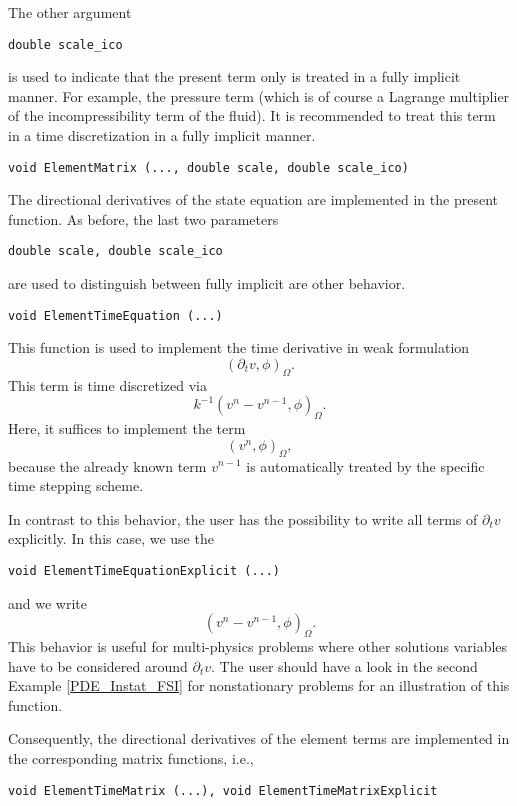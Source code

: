 The other argument
\begin{verbatim}
double scale_ico
\end{verbatim} 
is used to indicate that the present term 
only is treated in a fully implicit manner. 
For example, the pressure term (which is of course
a Lagrange multiplier of the incompressibility 
term of the fluid). It is recommended to treat 
this term in a time discretization in a fully 
implicit manner. 

\begin{verbatim}
void ElementMatrix (..., double scale, double scale_ico)
\end{verbatim}
The directional derivatives of the state equation
are implemented in the present function. As before,
the last two parameters
\begin{verbatim}
double scale, double scale_ico
\end{verbatim} 
are used to distinguish between fully implicit 
are other behavior. 

\begin{verbatim}
void ElementTimeEquation (...) 
\end{verbatim}
This function is used to implement the 
time derivative in weak formulation 
\begin{equation*}
(\partial_t v, \phi)_{\Omega}.
\end{equation*}
This term is time discretized via
\begin{equation*}
k^{-1} (v^n - v^{n-1} , \phi)_{\Omega}. 
\end{equation*}
Here, it suffices to implement the term
\begin{equation*}
(v^n, \phi)_{\Omega},
\end{equation*}
because the already known term $v^{n-1}$ is 
automatically treated by the specific time
stepping scheme. 

In contrast to this behavior, the user 
has the possibility to write all terms of 
$\partial_t v$ explicitly. In this case, we 
use the 
\begin{verbatim}
void ElementTimeEquationExplicit (...) 
\end{verbatim}
and we write 
\begin{equation*}
(v^n - v^{n-1}, \phi)_{\Omega}.
\end{equation*}
This behavior is useful for multi-physics problems
where other solutions variables have to be considered
around $\partial_t v$. The user should have a look 
in the second Example 
\ref{PDE_Instat_FSI} for nonstationary problems 
for an illustration
of this function. 

Consequently, the directional derivatives of the 
element terms are implemented in the corresponding
matrix functions, i.e., 
\begin{verbatim}
void ElementTimeMatrix (...), void ElementTimeMatrixExplicit 
\end{verbatim}



